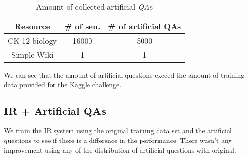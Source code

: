 \begin{table}[htp]
\caption{Amount of collected artificial \emph{QA}s}
\begin{center}
\begin{tabular}{|c|c|c|}
\hline
Resource&\# of sen.& \# of artificial QAs\\
\hline
CK 12 biology & 16000 & 5000\\
Simple Wiki & 1 & 1 \\
\hline
\end{tabular}
\end{center}
\label{artificialqa}
\end{table}%

We can see that the amount of artificial questions exceed the amount of training data provided for the Kaggle challenge.

\subsection{IR + Artificial QAs}
We train the IR system using the original training data set and the artificial questions to see if there is a difference in the performance. There wasn't any improvement using any of the distribution of artificial questions with original.
